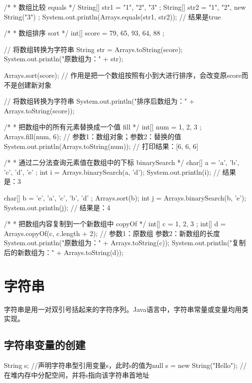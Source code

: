 
\begin{javaCode}
  /*
  * 数组比较 equals
  */
  String[] str1 = { "1", "2", "3" };
  String[] str2 = { "1", "2", new String("3") };
  System.out.println(Arrays.equals(str1, str2)); // 结果是true

  /*
  * 数组排序 sort
  */
  int[] score = { 79, 65, 93, 64, 88 };

  // 将数组转换为字符串
  String str = Arrays.toString(score);
  System.out.println("原数组为：" + str);

  Arrays.sort(score); // 作用是把一个数组按照有小到大进行排序，会改变原score而不是创建新对象

  // 将数组转换为字符串
  System.out.println("排序后数组为：" + Arrays.toString(score));

  /*
  * 把数组中的所有元素替换成一个值 fill
  */
  int[] num = { 1, 2, 3 };
  Arrays.fill(num, 6); // 参数1：数组对象；参数2：替换的值
  System.out.println(Arrays.toString(num)); // 打印结果：[6, 6, 6]

  /*
  * 通过二分法查询元素值在数组中的下标 binarySearch
  */
  char[] a = { 'a', 'b', 'c', 'd', 'e' };
  int i = Arrays.binarySearch(a, 'd');
  System.out.println(i); // 结果是：3

  char[] b = { 'e', 'a', 'c', 'b', 'd' };
  Arrays.sort(b);
  int j = Arrays.binarySearch(b, 'e');
  System.out.println(j); // 结果是：4

  /*
  * 把数组内容复制到一个新数组中 copyOf
  */
  int[] c = { 1, 2, 3 };
  int[] d = Arrays.copyOf(c, c.length + 2); // 参数1：原数组 参数2：新数组的长度
  System.out.println("原数组为：" + Arrays.toString(c));
  System.out.println("复制后的新数组为：" + Arrays.toString(d));  
\end{javaCode}


\section{字符串}

字符串是用一对双引号括起来的字符序列。Java语言中，字符串常量或变量均用类实现。

\subsection{字符串变量的创建}


\begin{javaCode}
  String s;                  //声明字符串型引用变量s，此时s的值为null
  s = new String("Hello");   //在堆内存中分配空间，并将s指向该字符串首地址
\end{javaCode}


